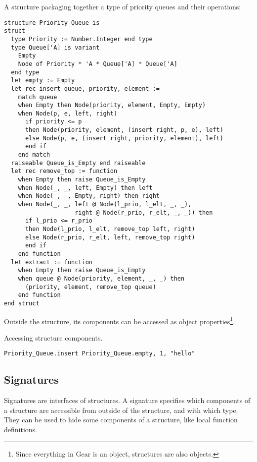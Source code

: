 \example A structure packaging together a type of priority queues and their operations:
\begin{lstlisting}
structure Priority_Queue is
struct
  type Priority := Number.Integer end type
  type Queue['A] is variant 
    Empty
    Node of Priority * 'A * Queue['A] * Queue['A]
  end type
  let empty := Empty
  let rec insert queue, priority, element :=
    match queue
    when Empty then Node(priority, element, Empty, Empty)
    when Node(p, e, left, right)
      if priority <= p
      then Node(priority, element, (insert right, p, e), left)
      else Node(p, e, (insert right, priority, element), left)
      end if
    end match
  raiseable Queue_is_Empty end raiseable
  let rec remove_top := function
    when Empty then raise Queue_is_Empty
    when Node(_, _, left, Empty) then left
    when Node(_, _, Empty, right) then right
    when Node(_, _, left @ Node(l_prio, l_elt, _, _), 
                    right @ Node(r_prio, r_elt, _, _)) then
      if l_prio <= r_prio
      then Node(l_prio, l_elt, remove_top left, right)
      else Node(r_prio, r_elt, left, remove_top right)
      end if
    end function
  let extract := function
    when Empty then raise Queue_is_Empty
    when queue @ Node(priority, element, _, _) then
      (priority, element, remove_top queue)
    end function
end struct
\end{lstlisting}

Outside the structure, its components can be accessed as object properties\footnote{Since everything in Gear is an object, structures are also objects.}. 

\example Accessing structure components.
\begin{lstlisting}
Priority_Queue.insert Priority_Queue.empty, 1, "hello"
\end{lstlisting}






\subsection{Signatures}

Signatures are interfaces of structures. A signature specifies which components of a structure are accessible from outside of the structure, and with which type. They can be used to hide some components of a structure, like local function definitions. 

